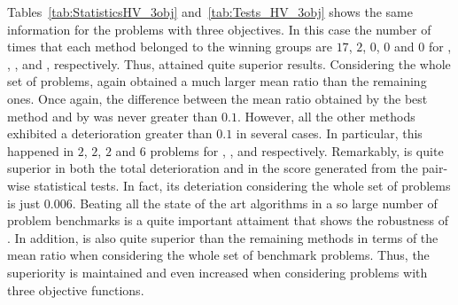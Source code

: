 



Tables~\ref{tab:StatisticsHV_3obj} and~\ref{tab:Tests_HV_3obj} shows the same information for the problems with three objectives.
%
In this case the number of times that each method belonged to the winning groups are $17$, $2$, $0$, $0$ and $0$ 
for \AVSDMOEAD{}, \RMOEA{}, \MOEADDE{}, \NSGAIII{} and \NSGAII{}, respectively.
%
Thus, \AVSDMOEAD{} attained quite superior results.
%
Considering the whole set of problems, \AVSDMOEAD{} again obtained a much larger mean \HV{} ratio than the remaining ones.
%
Once again, the difference between the mean \HV{} ratio obtained by the best method and by \AVSDMOEAD{} was never greater than $0.1$.
%
However, all the other methods exhibited a deterioration greater than $0.1$ in several cases.
%
In particular, this happened in $2$, $2$, $2$ and $6$ problems for \MOEADDE{}, \RMOEA{}, \NSGAIII{} and \NSGAII{} respectively.
%
Remarkably, \AVSDMOEAD{} is quite superior in both the total deterioration and in the score generated from the pair-wise
statistical tests.
%
In fact, its deteriation considering the whole set of problems is just $0.006$.
%
Beating all the state of the art algorithms in a so large number of problem benchmarks is a quite important attaiment that shows
the robustness of \AVSDMOEAD{}.
%
In addition, \AVSDMOEAD{} is also quite superior than the remaining methods in terms of the mean \HV{} ratio when considering the whole
set of benchmark problems.
%
Thus, the superiority is maintained and even increased when considering problems with three objective functions.
%
%
%
%



